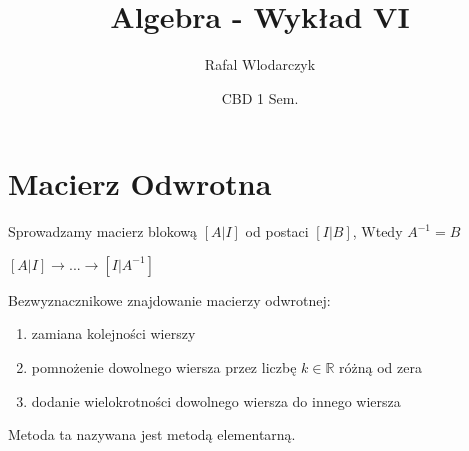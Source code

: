 \documentclass{article}
\author{Rafal Wlodarczyk}
\title{Algebra - Wykład VI}
\date{CBD 1 Sem.}
\theoremstyle{definition}
\theoremstyle{definition}
\theoremstyle{definition}
\theoremstyle{definition}
\begin{document}
\maketitle

\section{Macierz Odwrotna}

Sprowadzamy macierz blokową $[A|I]$ od postaci $[I|B]$, Wtedy $A^{-1}=B$

\begin{center}
    $[A|I]\rightarrow ... \rightarrow [I|A^{-1}]$
\end{center}

Bezwyznacznikowe znajdowanie macierzy odwrotnej:
\begin{enumerate}
    \item zamiana kolejności wierszy
    \item pomnożenie dowolnego wiersza przez liczbę $k\in\mathbb{R}$ różną od zera
    \item dodanie wielokrotności dowolnego wiersza do innego wiersza
\end{enumerate}
Metoda ta nazywana jest metodą elementarną.
\end{document}
